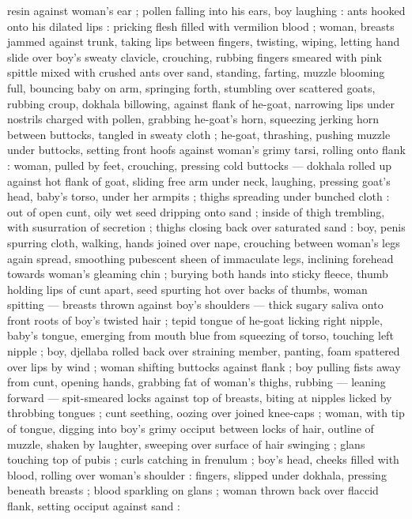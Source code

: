 resin against woman's ear ; pollen falling into his ears, boy laughing 
: ants hooked onto his dilated lips : pricking flesh filled with vermilion 
blood ; woman, breasts jammed against trunk, taking lips between 
fingers, twisting, wiping, letting hand slide over boy's sweaty clavicle, 
crouching, rubbing fingers smeared with pink spittle mixed with 
crushed ants over sand, standing, farting, muzzle blooming full, 
bouncing baby on arm, springing forth, stumbling over scattered 
goats, rubbing croup, dokhala billowing, against flank of he-goat, 
narrowing lips under nostrils charged with pollen, grabbing he-goat's 
horn, squeezing jerking horn between buttocks, tangled in sweaty 
cloth ; he-goat, thrashing, pushing muzzle under buttocks, setting 
front hoofs against woman's grimy tarsi, rolling onto flank : woman, 
pulled by feet, crouching, pressing cold buttocks --- dokhala rolled 
up against hot flank of goat, sliding free arm under neck, laughing, 
pressing goat's head, baby's torso, under her armpits ; thighs 
spreading under bunched cloth : out of open cunt, oily wet seed 
dripping onto sand ; inside of thigh trembling, with susurration of 
secretion ; thighs closing back over saturated sand : boy, penis 
spurring cloth, walking, hands joined over nape, crouching between 
woman's legs again spread, smoothing pubescent sheen of 
immaculate legs, inclining forehead towards woman's gleaming chin 
; burying both hands into sticky fleece, thumb holding lips of cunt 
apart, seed spurting hot over backs of thumbs, woman spitting --- 
breasts thrown against boy's shoulders --- thick sugary saliva onto 
front roots of boy's twisted hair ; tepid tongue of he-goat licking 
right nipple, baby's tongue, emerging from mouth blue from 
squeezing of torso, touching left nipple ; boy, djellaba rolled back 
over straining member, panting, foam spattered over lips by wind ; 
woman shifting buttocks against flank ; boy pulling fists away from 
cunt, opening hands, grabbing fat of woman's thighs, rubbing --- 
leaning forward --- spit-smeared locks against top of breasts, biting 
at nipples licked by throbbing tongues ; cunt seething, oozing over 
joined knee-caps ; woman, with tip of tongue, digging into boy's 
grimy occiput between locks of hair, outline of muzzle, shaken by 
laughter, sweeping over surface of hair swinging ; glans touching top 
of pubis ; curls catching in frenulum ; boy's head, cheeks filled with 
blood, rolling over woman's shoulder : fingers, slipped under 
dokhala, pressing beneath breasts ; blood sparkling on glans ; 
woman thrown back over flaccid flank, setting occiput against sand : 
